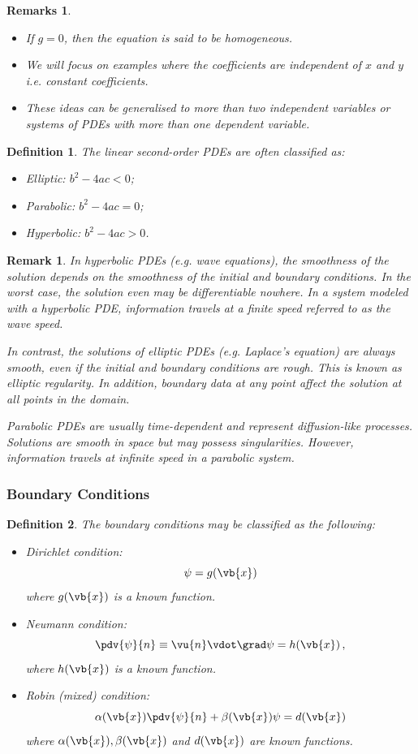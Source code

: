\documentclass{article}
\theoremstyle{plain}\theoremheaderfont{\normalfont\itshape}\theorembodyfont{\rmfamily}\theoremseparator{.}\newtheorem*{rem}{Remark}\newtheorem*{ex}{Example}\newtheorem*{proof}{Proof}\newtheorem*{altp}{Alternative proof}
\theoremstyle{plain}\theoremheaderfont{\normalfont\bfseries}\theorembodyfont{\rmfamily}\theoremseparator{.}\newtheorem{thm}{Theorem}[section]\newtheorem{lem}[thm]{Lemma}\newtheorem{prop}[thm]{Proposition}\newtheorem*{cor}{Corollary}\newtheorem{defn}[thm]{Definition}\newtheorem{clm}[thm]{Claim}\newtheorem{clminproof}{Claim}
\theoremstyle{break}\theoremheaderfont{\normalfont\itshape}\theorembodyfont{\rmfamily}\theoremseparator{.\medskip}\newtheorem*{proofskip}{Proof}\newtheorem*{exs}{Examples}\newtheorem*{rems}{Remarks}
\theoremstyle{break}\theoremheaderfont{\normalfont\bfseries}\theorembodyfont{\rmfamily}\theoremseparator{.\medskip}\newtheorem{lemskip}[thm]{Lemma}\newtheorem{defnskip}[thm]{Definition}\newtheorem{propskip}[thm]{Proposition}\newtheorem{thmskip}[thm]{Theorem}
\numberwithin{equation}{section}
\begin{document}
	\begin{rems}
		\begin{itemize}[topsep=0pt]
			\item If \(g=0\), then the equation is said to be homogeneous.
			\item We will focus on examples where the coefficients are independent of \(x\) and \(y\) i.e. constant coefficients.
			\item These ideas can be generalised to more than two independent variables or systems of PDEs with more than one dependent variable.
		\end{itemize}
	\end{rems}
	\begin{defn}
		The linear second-order PDEs are often classified as:
		\begin{itemize}[topsep=0pt]
			\item Elliptic: \(b^2-4ac<0\);
			\item Parabolic: \(b^2-4ac=0\);
			\item Hyperbolic: \(b^2-4ac>0\).
		\end{itemize}
	\end{defn}
	\begin{rem}
		In hyperbolic PDEs (e.g. wave equations), the smoothness of the solution depends on the smoothness of the initial and boundary conditions. In the worst case, the solution even may be differentiable nowhere. In a system modeled with a hyperbolic PDE, information travels at a finite speed referred to as the wave speed.

		In contrast, the solutions of elliptic PDEs (e.g. Laplace's equation) are always smooth, even if the initial and boundary conditions are rough. This is known as \textit{elliptic regularity}. In addition, boundary data at any point affect the solution at all points in the domain.

		Parabolic PDEs are usually time-dependent and represent diffusion-like processes. Solutions are smooth in space but may possess singularities. However, information travels at infinite speed in a parabolic system.
	\end{rem}
	\subsubsection{Boundary Conditions}
	\begin{defn}
		The boundary conditions may be classified as the following:
		\begin{itemize}[topsep=0pt]
			\item Dirichlet condition:
			\[\psi=g(\vb{x})\]
			where \(g(\vb{x})\) is a known function.
			\item Neumann condition:
			\[\pdv{\psi}{n}\equiv\vu{n}\vdot\grad\psi=h(\vb{x})\,,\]
			where \(h(\vb{x})\) is a known function.
			\item Robin (mixed) condition:
			\[\alpha(\vb{x})\pdv{\psi}{n}+\beta(\vb{x})\psi=d(\vb{x})\]
			where \(\alpha(\vb{x}),\beta(\vb{x})\) and \(d(\vb{x})\) are known functions.
		\end{itemize}
	\end{defn}
\end{document}
